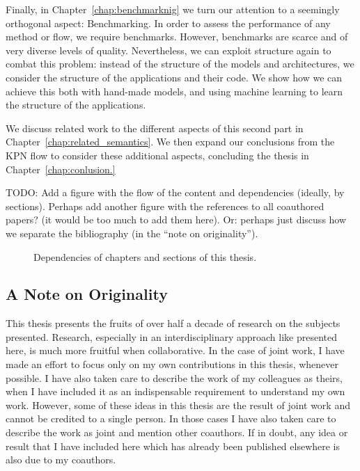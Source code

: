 Finally, in Chapter~\ref{chap:benchmarknig} we turn our attention to a seemingly orthogonal aspect: Benchmarking.
In order to assess the performance of any method or flow, we require benchmarks.
However, benchmarks are scarce and of very diverse levels of quality.
Nevertheless, we can exploit structure again to combat this problem: instead of the structure of the models and architectures, we consider the structure of the applications and their code.
We show how we can achieve this both with hand-made models, and using machine learning to learn the structure of the applications.

We discuss related work to the different aspects of this second part in Chapter~\ref{chap:related_semantics}.
We then expand our conclusions from the \ac{KPN} flow to consider these additional aspects, concluding the thesis in Chapter~\ref{chap:conlusion.}

TODO: Add a figure with the flow of the content and dependencies (ideally, by sections). Perhaps add another figure with the references to all coauthored papers? (it would be too much to add them here). Or: perhaps just discuss how we separate the bibliography (in the ``note on originality'').

\begin{figure}[h]
	\centering
   \resizebox{0.5\textwidth}{!}{}
   \caption{Dependencies of chapters and sections of this thesis.}
	\label{fig:multicore_era}
\end{figure}


\subsection{A Note on Originality}

This thesis presents the fruits of over half a decade of research on the subjects presented.
Research, especially in an interdisciplinary approach like presented here, is much more fruitful when collaborative.
In the case of joint work, I have made an effort to focus only on my own contributions in this thesis, whenever possible.
I have also taken care to describe the work of my colleagues as theirs, when I have included it as an indispensable requirement to understand my own work.
However, some of these ideas in this thesis are the result of joint work and cannot be credited to a single person.
In those cases I have also taken care to describe the work as joint and mention other coauthors.
If in doubt, any idea or result that I have included here which has already been published elsewhere is also due to my coauthors.


